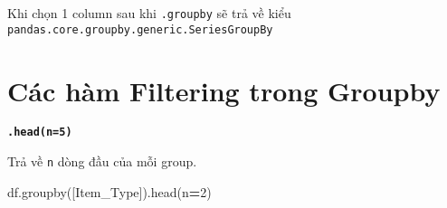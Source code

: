 \documentclass[
]{book}
\newenvironment{Shaded}{\begin{snugshade}}{\end{snugshade}}
\newcommand{\DecValTok}[1]{\textcolor[rgb]{0.00,0.00,0.81}{#1}}
\newcommand{\NormalTok}[1]{#1}
\newcommand{\OperatorTok}[1]{\textcolor[rgb]{0.81,0.36,0.00}{\textbf{#1}}}
\newcommand{\StringTok}[1]{\textcolor[rgb]{0.31,0.60,0.02}{#1}}
\begin{document}
Khi chọn 1 column sau khi \texttt{.groupby} sẽ trả về kiểu \texttt{pandas.core.groupby.generic.SeriesGroupBy}

\section{Các hàm Filtering trong Groupby}\label{cuxe1c-huxe0m-filtering-trong-groupby}

\textbf{\texttt{.head(n=5)}}

Trả về \texttt{n} dòng đầu của mỗi group.

\begin{Shaded}
\begin{Highlighting}[]
\NormalTok{df.groupby([}\StringTok{\textquotesingle{}Item\_Type\textquotesingle{}}\NormalTok{]).head(n}\OperatorTok{=}\DecValTok{2}\NormalTok{)}
\end{Highlighting}
\end{Shaded}
\end{document}
